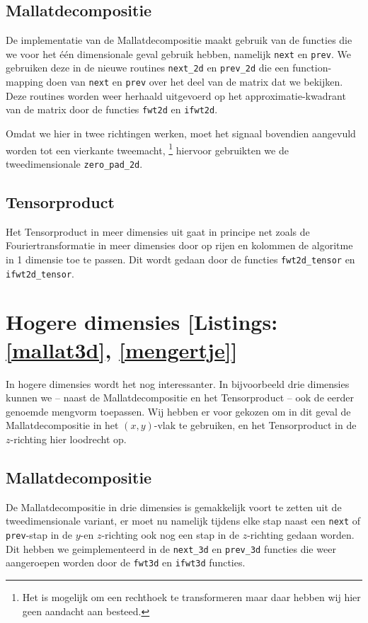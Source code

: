 \subsection{Mallatdecompositie}
De implementatie van de Mallatdecompositie maakt gebruik van de functies die we voor het \'e\'en dimensionale geval 
gebruik hebben, namelijk \texttt{next} en \texttt{prev}.
We gebruiken deze in de nieuwe routines \texttt{next\_2d} en \texttt{prev\_2d} die een function-mapping doen
van \texttt{next} en \texttt{prev} over het deel van de matrix dat we bekijken.
Deze routines worden weer herhaald uitgevoerd op het approximatie-kwadrant van de matrix door de 
functies \texttt{fwt2d} en \texttt{ifwt2d}.

Omdat we hier in twee richtingen werken, moet het signaal bovendien aangevuld worden tot een vierkante tweemacht,
\footnote{Het is mogelijk om een rechthoek te transformeren maar daar hebben wij hier geen aandacht aan besteed.}
hiervoor gebruikten we de tweedimensionale \texttt{zero\_pad\_2d}.

\subsection{Tensorproduct}
Het Tensorproduct in meer dimensies uit  gaat in principe net zoals de Fouriertransformatie in meer dimensies 
door op rijen en kolommen de algoritme in 1 dimensie toe te passen.
Dit wordt gedaan door de functies \texttt{fwt2d\_tensor} en \texttt{ifwt2d\_tensor}.
 
\section{Hogere dimensies [Listings: \ref{mallat3d}, \ref{mengertje}]}
In hogere dimensies wordt het nog interessanter. In bijvoorbeeld drie dimensies kunnen we -- naast de Mallatdecompositie en het Tensorproduct -- ook de eerder genoemde mengvorm toepassen. Wij hebben er voor gekozen om in dit geval de Mallatdecompositie in het $(x,y)$-vlak te gebruiken, en het Tensorproduct in de $z$-richting hier loodrecht op.

\subsection{Mallatdecompositie}
De Mallatdecompositie in drie dimensies is gemakkelijk voort te zetten uit de tweedimensionale variant,
er moet nu namelijk tijdens elke stap naast een \texttt{next} of \texttt{prev}-stap in de $y$-en $z$-richting ook nog een stap 
in de $z$-richting gedaan worden. Dit hebben we geimplementeerd in de \texttt{next\_3d} en \texttt{prev\_3d} functies die
weer aangeroepen worden door de \texttt{fwt3d} en \texttt{ifwt3d} functies.

